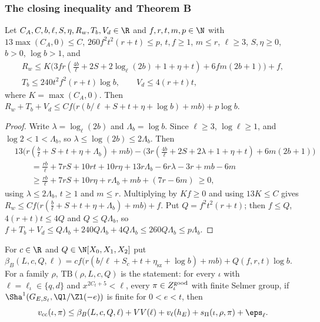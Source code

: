 \subsubsection{The closing inequality and Theorem B}

\begin{lemma}\label{pf:linkN-sel:closing}
Let $C_A,C,b,\ell,S,\eta,R_w,T_b,V_d\in\R$ and $f,r,t,m,p\in\N$ with $13\max(C_A,0)\le C$, $260f^2t^2(r+t)\le p$, $t,f\ge1$, $m\le r$,
$\ell\ge3$, $S,\eta\ge0$, $b>0$, $\log b>1$, and
\begin{gather*}
R_w\le K\bigl(3fr(\tfrac{4b}\ell+2S+2\log_\ell(2b)+1+\eta+t)+6fm(2b+1)\bigr)+f,\\
T_b\le240t^2f^2(r+t)\log b,\qquad V_d\le4(r+t)t,
\end{gather*}
where $K=\max(C_A,0)$. Then $R_w+T_b+V_d\le Cf\bigl(r(b/\ell+S+t+\eta+\log b)+mb\bigr)+p\log b$.
\end{lemma}

\begin{proof}
Write $\lambda=\log_\ell(2b)$ and $\Lambda_b=\log b$. Since $\ell\ge3$, $\log\ell\ge1$, and $\log2<1<\Lambda_b$, so $\lambda\le\log(2b)\le
2\Lambda_b$. Then
\begin{align*}
&13\bigl(r(\tfrac b\ell+S+t+\eta+\Lambda_b)+mb\bigr)-\bigl(3r(\tfrac{4b}\ell+2S+2\lambda+1+\eta+t)+6m(2b+1)\bigr)\\
&\qquad=\tfrac{rb}\ell+7rS+10rt+10r\eta+13r\Lambda_b-6r\lambda-3r+mb-6m\\
&\qquad\ge\tfrac{rb}\ell+7rS+10r\eta+r\Lambda_b+mb+(7r-6m)\ \ge0,
\end{align*}
using $\lambda\le2\Lambda_b$, $t\ge1$ and $m\le r$. Multiplying by $Kf\ge0$ and using $13K\le C$ gives
$R_w\le Cf\bigl(r(\frac b\ell+S+t+\eta+\Lambda_b)+mb\bigr)+f$. Put $Q=f^2t^2(r+t)$; then $f\le Q$, $4(r+t)t\le4Q$ and $Q\le Q\Lambda_b$, so
$f+T_b+V_d\le Q\Lambda_b+240Q\Lambda_b+4Q\Lambda_b\le260Q\Lambda_b\le p\Lambda_b$.
\end{proof}

\begin{definition}\label{pf:linkN-sel:TBdef}
For $c\in\R$ and $Q\in\N[X_0,X_1,X_2]$ put $\beta_B(L,c,Q,\ell)=cf\bigl(r(b/\ell+S_c+t+\eta_{\mathrm{sz}}+\log b)+mb\bigr)+Q(f,r,t)\log b$.
For a family $\rho$, $\mathrm{TB}(\rho,L,c,Q)$ is the statement: for every $\iota$ with $\ell=\ell_\iota\in\{q,d\}$ and $x^{2C_t+5}<\ell$,
every $\pi\in Z^{\mathrm{good}}_\iota$ with finite Selmer group, if $\Sha^1(G_{E,S_\ell},\Ql/\Zl(-e))$ is finite for $0<e<t$, then
\begin{equation}\label{eq:pf:linkN-sel:conc2}
\linkNselvcc(\iota,\pi)\le\beta_B(L,c,Q,\ell)+VV(\ell)+v_\ell(h_E)+\linkNselsP(\iota,\rho,\pi)+\eps_\ell .
\end{equation}
\end{definition}


